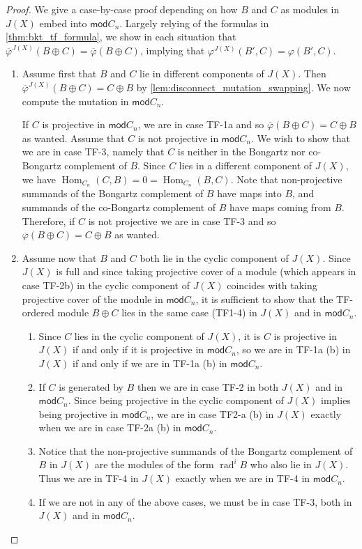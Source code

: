 \documentclass[11pt]{amsart}
\newcommand{\mods}{\mathsf{mod}}
\DeclareMathOperator{\Hom}{\mathrm{Hom}}
\DeclareMathOperator{\rad}{\mathrm{rad}}
\theoremstyle{definition}
\begin{document}
\begin{proof}

    We give a case-by-case proof depending on how $B$ and $C$ as modules in $J(X)$ embed into $\mods C_n$. Largely relying of the formulas in \cref{thm:bkt_tf_formula}, we show in each situation that $\overline{\varphi}^{J(X)}(B\oplus C) = \overline{\varphi}(B\oplus C)$, implying that $\varphi^{J(X)}(B',C) = \varphi(B',C)$.

    \begin{enumerate}
        \item Assume first that $B$ and $C$ lie in different components of $J(X)$. Then $\overline{\varphi}^{J(X)}(B \oplus C) = C \oplus B$ by \cref{lem:disconnect_mutation_swapping}. We now compute the mutation in $\mods C_n$. 

        If $C$ is projective in $\mods C_n$, we are in case TF-1a and so $\overline{\varphi}(B \oplus C) = C \oplus B$ as wanted. Assume that $C$ is not projective in $\mods C_n$. We wish to show that we are in case TF-3, namely that $C$ is neither in the Bongartz nor co-Bongartz complement of $B$. Since $C$ lies in a different component of $J(X)$, we have $\Hom_{C_n}(C,B) = 0 = \Hom_{C_n}(B,C)$. Note that non-projective summands of the Bongartz complement of $B$ have maps into $B$, and summands of the co-Bongartz complement of $B$ have maps coming from $B$. Therefore, if $C$ is not projective we are in case TF-3 and so $\overline{\varphi}(B\oplus C) = C\oplus B$ as wanted.
        
        \item Assume now that $B$ and $C$ both lie in the cyclic component of $J(X)$. Since $J(X)$ is full and since taking projective cover of a module (which appears in case TF-2b) in the cyclic component of $J(X)$ coincides with taking projective cover of the module in $\mods C_n$, it is sufficient to show that the TF-ordered module $B \oplus C$ lies in the same case (TF1-4) in $J(X)$ and in $\mods C_n$.

        \begin{enumerate}
            \item[(TF-1)]  Since $C$ lies in the cyclic component of $J(X)$, it is $C$ is projective in $J(X)$ if and only if it is projective in $\mods C_n$, so we are in TF-1a (b)  in $J(X)$ if and only if we are in TF-1a (b) in $\mods C_n$.
            \item[(TF-2)] If $C$ is generated by $B$ then we are in case TF-2 in both $J(X)$ and in $\mods C_n$. Since being projective in the cyclic component of $J(X)$ implies being projective in $\mods C_n$, we are in case TF2-a (b) in $J(X)$ exactly when we are in case TF-2a (b) in $\mods C_n$.
            \item[(TF-4)] Notice that the non-projective summands of the Bongartz complement of $B$ in $J(X)$ are the modules of the form $\rad^i B$ who also lie in $J(X)$. Thus we are in TF-4 in $J(X)$ exactly when we are in TF-4 in $\mods C_n$.
            \item[(TF-3)] If we are not in any of the above cases, we must be in case TF-3, both in $J(X)$ and in $\mods C_n$.
        \end{enumerate}


\end{enumerate}
\end{proof}
\end{document}
